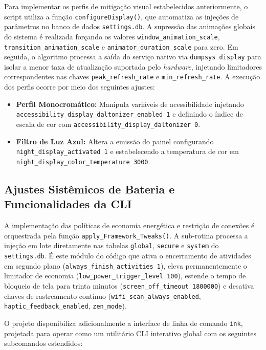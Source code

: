 \documentclass[
    12pt,
    openright,
    oneside,
    a4paper,
    english,
    brazilian
    ]{abntex2}
\begin{document}
Para implementar os perfis de mitigação visual estabelecidos anteriormente, o script utiliza a função \texttt{configureDisplay()}, que automatiza as injeções de parâmetros no banco de dados \texttt{settings.db}. A supressão das animações globais do sistema é realizada forçando os valores \texttt{window\_animation\_scale}, \texttt{transition\_animation\_scale} e \texttt{animator\_duration\_scale} para zero. Em seguida, o algoritmo processa a saída do serviço nativo via \texttt{dumpsys display} para isolar a menor taxa de atualização suportada pelo \textit{hardware}, injetando limitadores correspondentes nas chaves \texttt{peak\_refresh\_rate} e \texttt{min\_refresh\_rate}. A execução dos perfis ocorre por meio dos seguintes ajustes:

\begin{itemize}
    \item \textbf{Perfil Monocromático:} Manipula variáveis de acessibilidade injetando \texttt{accessibility\_display\_daltonizer\_enabled 1} e definindo o índice de escala de cor com \texttt{accessibility\_display\_daltonizer 0}.
    \item \textbf{Filtro de Luz Azul:} Altera a emissão do painel configurando \texttt{night\_display\_activated 1} e estabelecendo a temperatura de cor em \texttt{night\_display\_color\_temperature 3000}.
\end{itemize}

\subsection{Ajustes Sistêmicos de Bateria e Funcionalidades da CLI}

A implementação das políticas de economia energética e restrição de conexões é orquestrada pela função \texttt{apply\_Framework\_Tweaks()}. A sub-rotina processa a injeção em lote diretamente nas tabelas \texttt{global}, \texttt{secure} e \texttt{system} do \texttt{settings.db}. É este módulo do código que ativa o encerramento de atividades em segundo plano (\texttt{always\_finish\_activities 1}), eleva permanentemente o limitador de economia (\texttt{low\_power\_trigger\_level 100}), estende o tempo de bloqueio de tela para trinta minutos (\texttt{screen\_off\_timeout 1800000}) e desativa chaves de rastreamento contínuo (\texttt{wifi\_scan\_always\_enabled}, \texttt{haptic\_feedback\_enabled}, \texttt{zen\_mode}).

O projeto disponibiliza adicionalmente a interface de linha de comando \texttt{ink}, projetada para operar como um utilitário CLI interativo global com os seguintes subcomandos estendidos:
\end{document}
